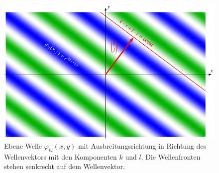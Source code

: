 %
%
%
\begin{figure}
\centering
\includegraphics{chapters/050-radon/images/ebenewellen.pdf}
\caption{Ebene Welle $\varphi_{kl}(x,y)$ mit Ausbreitungsrichtung
in Richtung des Wellenvektors mit den Komponenten $k$ und $l$.
Die Wellenfronten stehen senkrecht auf dem Wellenvektor.
\label{buch:radon:fig:ebenewelle}}
\end{figure}

